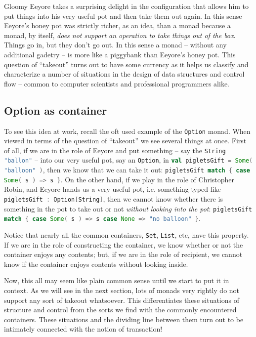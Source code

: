 Gloomy Eeyore takes a surprising delight in the configuration that
allows him to put things into his very useful pot and then take them
out again. In this sense Eeyore's honey pot was strictly richer, as an
idea, than a monad because a monad, by itself, \emph{does not support
  an operation to take things out of the box}. Things go in, but they
don't go out. In this sense a monad -- without any additional gadetry
-- is more like a piggybank than Eeyore's honey pot. This question of
``takeout'' turns out to have some currency as it helps us classify
and characterize a number of situations in the design of data
structures and control flow -- common to computer scientists and
professional programmers alike.

\subsection{Option as container}

To see this idea at work, recall the oft used example of the
\lstinline[language=Scala,mathescape=true]!Option! monad. When viewed
in terms of the question of ``takeout'' we see several things at
once. First of all, if we are in the role of Eeyore and put something
-- say the \lstinline[language=Scala,mathescape=true]!String!
\lstinline[language=Scala,mathescape=true]!"ballon"! -- into our very
useful pot, say an \lstinline[language=Scala,mathescape=true]!Option!,
in \lstinline[language=Scala,mathescape=true]!val pigletsGift = Some( "balloon" )!, then we know that we can take it out:
\lstinline[language=Scala,mathescape=true]!pigletsGift match { case Some( s ) => s }!. On the other hand, if we play in the role of Christopher Robin, and Eeyore hands us a very useful pot, i.e. something typed like \lstinline[language=Scala,mathescape=true]!pigletsGift : Option[String]!, then we cannot know whether there is something in the pot to take out or not \emph{without looking into the pot}: \lstinline[language=Scala,mathescape=true]!pigletsGift match { case Some( s ) => s case None => "no balloon" }!.

Notice that nearly all the common containers,
\lstinline[language=Scala,mathescape=true]!Set!,
\lstinline[language=Scala,mathescape=true]!List!, etc, have this
property. If we are in the role of constructing the container, we know
whether or not the container enjoys any contents; but, if we are in
the role of recipient, we cannot know if the container enjoys contents
without looking inside.

Now, this all may seem like plain common sense until we start to put
it in context. As we will see in the next section, lots of monads very
rightly do not support any sort of takeout whatsoever. This
differentiates these situations of structure and control from the
sorts we find with the commonly encountered containers. These
situations and the dividing line between them turn out to be
intimately connected with the notion of transaction! 

